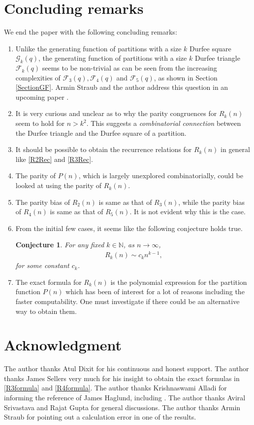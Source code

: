 \documentclass[12pt,reqno]{amsart}
\numberwithin{equation}{section}
\theoremstyle{plain}
\newtheorem{conjecture}[theorem]{Conjecture}
\begin{document}
	\section{Concluding remarks}
	We end the paper with the following concluding remarks:
	\begin{enumerate}
		\item Unlike the generating function of partitions with a size $k$ Durfee square $\mathscr{G}_k(q)$, the generating function of partitions with a size $k$ Durfee triangle $\mathscr{F}_k(q)$ seems to be non-trivial as can be seen from the increasing complexities of $\mathscr{F}_3(q), \mathscr{F}_4(q)$ and $\mathscr{F}_5(q)$, as shown in Section \ref{SectionGF}. Armin Straub and the author address this question in an upcoming paper \cite{DurfeeTri}.
		\item It is very curious and unclear as to why the parity congruences for $R_k(n)$ seem to hold for $n>k^2$. This suggests a \textit{combinatorial connection} between the Durfee triangle and the Durfee square of a partition.
		\item It should be possible to obtain the recurrence relations for $R_k(n)$ in general like \eqref{R2Rec} and \eqref{R3Rec}.
		\item The parity of $P(n)$, which is largely unexplored combinatorially, could be looked at using the parity of $R_k(n)$.
		\item The parity bias of $R_2(n)$ is same as that of $R_3(n)$, while the parity bias of $R_4(n)$ is same as that of $R_5(n)$. It is not evident why this is the case.
		\item From the initial few cases, it seems like the following conjecture holds true.
		\begin{conjecture}
			For any fixed $k \in \mathbb{N}$, as $n \to \infty$,
				\begin{align*}
					R_k(n) \sim c_k n^{k-1},
				\end{align*}
				for some constant $c_k$.
		\end{conjecture} 
		\item The exact formula for $R_k(n)$ is the polynomial expression for the partition function $P(n)$ which has been of interest for a lot of reasons including the faster computability. One must investigate if there could be an alternative way to obtain them. 
	\end{enumerate}
	
	\section{Acknowledgment}
	The author thanks Atul Dixit for his continuous and honest support. The author thanks James Sellers very much for his insight to obtain the exact formulas in \ref{R3formula} and \ref{R4formula}. The author thanks Krishnaswami Alladi for informing the reference of James Haglund, including \cite{BHR}. The author thanks Aviral Srivastava and Rajat Gupta for general discussions. The author thanks Armin Straub for pointing out a calculation error in one of the results.
	
\end{document}
